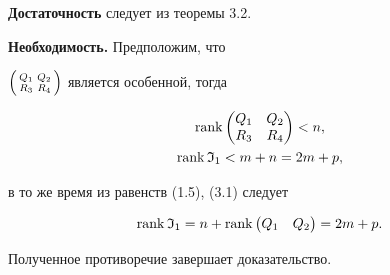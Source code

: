  


 


\begin{pf} 


{\bf Достаточность} следует из теоремы 3.2. 


\medskip 


 


 


{\bf Необходимость.} Предположим, что 


$\left(\begin{smallmatrix}Q_1 & Q_2 \\ R_3 & R_4\end{smallmatrix}\right)$ является особенной, тогда 


\begin{gather*} 


\rank\begin{pmatrix}Q_1 & Q_2 \\ R_3 & R_4 \end{pmatrix}<n,\\ 


\rank\frak I_1<m+n=2m+p, 


\end{gather*} 


в то же время из равенств (1.5), (3.1) следует 


$$ 


\rank\frak I_1=n+\rank\begin{pmatrix}Q_1 & Q_2 \end{pmatrix} 


=2m+p. 


$$ 


Полученное противоречие завершает доказательство. 


\end{pf} 


 


